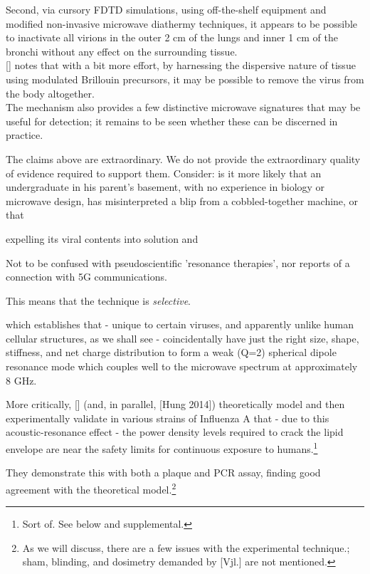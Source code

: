 \documentclass[paper.tex]{subfiles}
\begin{document}
\begin{multicols}{1}
%
Second, via cursory FDTD simulations, using off-the-shelf equipment and modified non-invasive microwave diathermy techniques, it appears to be possible to inactivate all virions in the outer 2 cm of the lungs and inner 1 cm of the bronchi without any effect on the surrounding tissue. 
\\

[] notes that with a bit more effort, by harnessing the dispersive nature of tissue using modulated Brillouin precursors, it may be possible to remove the virus from the body altogether.\\

The mechanism also provides a few distinctive microwave signatures that may be useful for detection; it remains to be seen whether these can be discerned in practice.

The claims above are extraordinary. We do not provide the extraordinary quality of evidence required to support them. Consider: is it more likely that an undergraduate in his parent's basement, with no experience in biology or microwave design, has misinterpreted a blip from a cobbled-together machine, or that 

expelling its viral contents into solution and 

Not to be confused with pseudoscientific 'resonance therapies', nor reports of a connection with 5G communications.

This means that the technique is {\it selective}.






which establishes that - unique to certain viruses, and apparently unlike human cellular structures, as we shall see - coincidentally have just the right size, shape, stiffness, and net charge distribution to form a weak (Q=2) spherical dipole resonance mode which couples well to the microwave spectrum at approximately 8 GHz.

More critically, [] (and, in parallel, [Hung 2014]) theoretically model and then experimentally validate in various strains of Influenza A that - due to this acoustic-resonance effect - the power density levels required to crack the lipid envelope are near the safety limits for continuous exposure to humans.\footnote{Sort of. See below and supplemental.}

They demonstrate this with both a plaque and PCR assay, finding good agreement with the theoretical model.\footnote{As we will discuss, there are a few issues with the experimental technique.; sham, blinding, and dosimetry demanded by [Vjl.] are not mentioned.}


\end{multicols}
\end{document}
